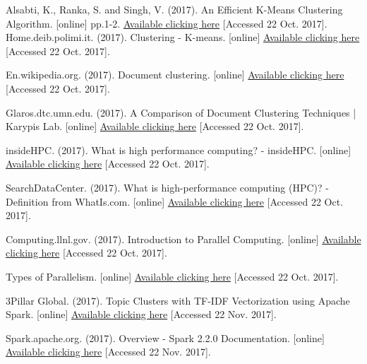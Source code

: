 \documentclass[fleqn,10pt]{SelfArx} %
\begin{document}
\begin{thebibliography}{9}

Alsabti, K., Ranka, S. and Singh, V. (2017). An Efficient K-Means Clustering Algorithm. [online] pp.1-2. \href{https://www.cs.utexas.edu/~kuipers/readings/Alsabti-hpdm-98.pdf}{Available clicking here} [Accessed 22 Oct. 2017].
Home.deib.polimi.it. (2017). Clustering - K-means. [online] \href{http://home.deib.polimi.it/matteucc/Clustering/tutorial_html/kmeans.html}{Available clicking here} [Accessed 22 Oct. 2017].
 
En.wikipedia.org. (2017). Document clustering. [online] \href{https://en.wikipedia.org/wiki/Document_clustering}{Available clicking here} [Accessed 22 Oct. 2017].

Glaros.dtc.umn.edu. (2017). A Comparison of Document Clustering Techniques | Karypis Lab. [online] \href{http://glaros.dtc.umn.edu/gkhome/node/157}{Available clicking here} [Accessed 22 Oct. 2017].

insideHPC. (2017). What is high performance computing? - insideHPC. [online] \href{https://insidehpc.com/hpc-basic-training/what-is-hpc/}{Available clicking here}  [Accessed 22 Oct. 2017].

SearchDataCenter. (2017). What is high-performance computing (HPC)? - Definition from WhatIs.com. [online] 
\href{http://searchdatacenter.techtarget.com/definition/high-performance-computing-HPC}{Available clicking here}   [Accessed 22 Oct. 2017].



Computing.llnl.gov. (2017). Introduction to Parallel Computing. [online] \href{https://computing.llnl.gov/tutorials/parallel_comp/}{Available clicking here}  [Accessed 22 Oct. 2017].


Types of Parallelism. [online] \href{http://www.inf.ed.ac.uk/teaching/courses/pa/Notes/lecture02-types.pdf}{Available clicking here} [Accessed 22 Oct. 2017].

3Pillar Global. (2017). Topic Clusters with TF-IDF Vectorization using Apache Spark. [online]  \href{https://www.3pillarglobal.com/insights/topic-clusters-tf-idf-vectorization-using-apache-spark}{Available clicking here} [Accessed 22 Nov. 2017].

Spark.apache.org. (2017). Overview - Spark 2.2.0 Documentation. [online]  \href{https://spark.apache.org/docs/latest/index.html}{Available clicking here} [Accessed 22 Nov. 2017].


\end{thebibliography}




\end{document}
